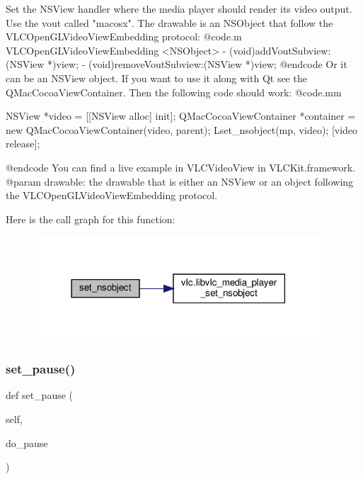 \begin{DoxyVerb}Set the NSView handler where the media player should render its video output.
Use the vout called "macosx".
The drawable is an NSObject that follow the VLCOpenGLVideoViewEmbedding
protocol:
@code.m
\@protocol VLCOpenGLVideoViewEmbedding <NSObject>
- (void)addVoutSubview:(NSView *)view;
- (void)removeVoutSubview:(NSView *)view;
\@end
@endcode
Or it can be an NSView object.
If you want to use it along with Qt see the QMacCocoaViewContainer. Then
the following code should work:
@code.mm

    NSView *video = [[NSView alloc] init];
    QMacCocoaViewContainer *container = new QMacCocoaViewContainer(video, parent);
    L{set_nsobject}(mp, video);
    [video release];

@endcode
You can find a live example in VLCVideoView in VLCKit.framework.
@param drawable: the drawable that is either an NSView or an object following the VLCOpenGLVideoViewEmbedding protocol.
\end{DoxyVerb}
 Here is the call graph for this function\+:
\nopagebreak
\begin{figure}[H]
\begin{center}
\leavevmode
\includegraphics[width=306pt]{classvlc_1_1_media_player_a569de1fbcc475f3eef8dbf4e938851a6_cgraph}
\end{center}
\end{figure}
\mbox{\label{classvlc_1_1_media_player_ab35d8dc9f1faad46ff204872a225ad49}} 
\subsubsection{\texorpdfstring{set\+\_\+pause()}{set\_pause()}}
{\footnotesize\ttfamily def set\+\_\+pause (\begin{DoxyParamCaption}\item[{}]{self,  }\item[{}]{do\+\_\+pause }\end{DoxyParamCaption})}

